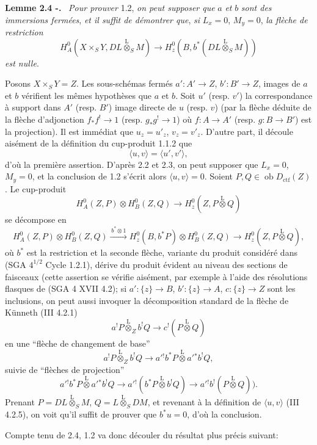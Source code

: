 \documentclass[11pt]{article}
\newenvironment{statement}[1]{\par\medskip\noindent\textbf{#1.}\ }{\par\medskip}
\providecommand{\lten}{\overset{\mathrm L}{\otimes}}
\providecommand{\Ob}{\operatorname{ob}}
\providecommand{\lten}{\overset{\mathrm L}{\otimes}}
\providecommand{\lten}{\overset{\mathrm L}{\otimes}}
\providecommand{\Ob}{\operatorname{ob}}
\providecommand{\lten}{\overset{\mathrm L}{\otimes}}
\providecommand{\lten}{\overset{\mathrm L}{\otimes}}
\providecommand{\Ob}{\operatorname{Ob}}
\providecommand{\lten}{\overset{\mathrm L}{\otimes}}
\providecommand{\Ob}{\operatorname{ob}}
\providecommand{\Ob}{\operatorname{Ob}}
\providecommand{\lten}{\overset{\mathrm L}{\otimes}}
\begin{document}
\begin{statement}{Lemme 2.4 -}
\emph{Pour prouver} 1.2, \emph{on peut supposer que} $a$ \emph{et} $b$ \emph{sont des immersions fermées}, \emph{et il suffit de démontrer que}, \emph{si} $L_x=0$, $M_y=0$, \emph{la flèche de restriction}
\begin{equation}
H_A^0(X\times_SY,DL\lten_SM)
 \longrightarrow H_z^0(B,b^*(DL\lten_SM))
\tag{2.4.1}
\end{equation}
\emph{est nulle}.
\end{statement}

Posons $X\times_SY=Z$. Les sous-schémas fermés $a':A'\to Z$, $b':B'\to Z$, images de $a$ et $b$ vérifient les mêmes hypothèses que $a$ et $b$. Soit $u'$ (resp. $v'$) la correspondance à support dans $A'$ (resp. $B'$) image directe de $u$ (resp. $v$) (par la flèche déduite de la flèche d'adjonction $f_*f^!\to 1$ (resp. $g_*g^!\to 1$) où $f:A\to A'$ (resp. $g:B\to B'$) est la projection). Il est immédiat que $u_z=u'_z$, $v_z=v'_z$. D'autre part, il découle aisément de la définition du cup-produit 1.1.2 que
\[
\langle u,v\rangle=\langle u',v'\rangle,
\]
d'où la première assertion. D'après 2.2 et 2.3, on peut supposer que $L_x=0$, $M_y=0$, et la conclusion de 1.2 s'écrit alors $\langle u,v\rangle=0$. Soient $P,Q\in\Ob D_{\mathrm{ctf}}(Z)$. Le cup-produit
\[
H_A^0(Z,P)\otimes H_B^0(Z,Q)\longrightarrow H_z^0(Z,P\lten Q)
\]
se décompose en
\[
H_A^0(Z,P)\otimes H_B^0(Z,Q)
 \xrightarrow{\,b^*\otimes 1\,}
H_z^0(B,b^*P)\otimes H_B^0(Z,Q)
 \longrightarrow H_z^0(Z,P\lten Q),
\]
où $b^*$ est la restriction et la seconde flèche, variante du produit considéré dans (SGA $4^{1/2}$ Cycle 1.2.1), dérive du produit évident au niveau des sections de faisceaux (cette assertion se vérifie aisément, par exemple à l'aide des résolutions flasques de (SGA 4 XVII 4.2); si $a':\{z\}\to B$, $b':\{z\}\to A$, $c:\{z\}\to Z$ sont les inclusions, on peut aussi invoquer la décomposition standard de la flèche de Künneth (III 4.2.1)
\[
a^!P\lten_Z b^!Q\longrightarrow c^!(P\lten Q)
\]
en une ``flèche de changement de base''
\[
a^!P\lten_Z b^!Q\longrightarrow a'{}^!b^*P\lten a'{}^*b^!Q,
\]
suivie de ``flèches de projection''
\[
a'{}^!b^*P\lten a'{}^*b^!Q
 \longrightarrow a'{}^!(b^*P\lten b^!Q)
 \longrightarrow a'{}^!b^!(P\lten Q)).
\]
Prenant $P=DL\lten_SM$, $Q=L\lten_SDM$, et revenant à la définition de $\langle u,v\rangle$ (III 4.2.5), on voit qu'il suffit de prouver que $b^*u=0$, d'où la conclusion.

Compte
tenu de 2.4, 1.2 va donc découler du résultat plus précis suivant:
\end{document}
